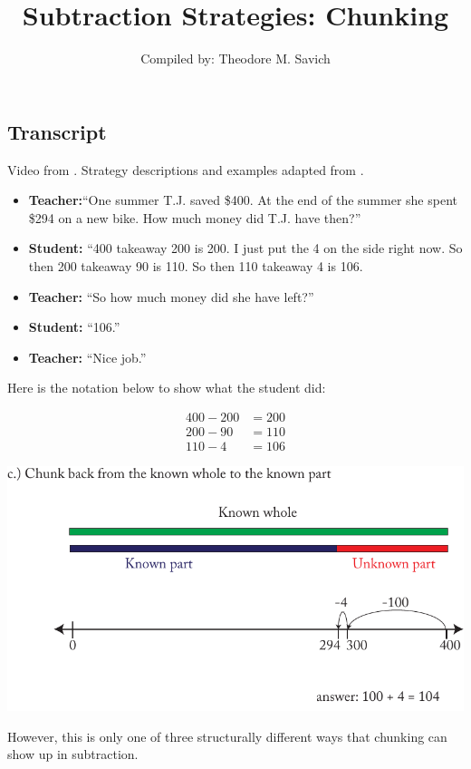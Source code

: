 \documentclass[11pt]{article}
\title{Subtraction Strategies: Chunking}
\author{Compiled by: Theodore M. Savich}
\begin{document}
\maketitle



\subsection*{Transcript}
Video from \textcite{Carpenter1999}. Strategy descriptions and examples adapted from \textcite{HackenbergCourseNotes}. 


\begin{itemize}
    \item \textbf{Teacher:}``One summer T.J. saved \$400. At the end of the summer she spent \$294 on a new bike. How much money did T.J. have then?''
    \item \textbf{Student:} ``400 takeaway 200 is 200. I just put the 4 on the side right now. So then 200 takeaway 90 is 110. So then 110 takeaway 4 is 106. 
    \item \textbf{Teacher:} ``So how much money did she have left?''
    \item \textbf{Student:} ``106.''
    \item \textbf{Teacher:} ``Nice job.''
\end{itemize}

Here is the notation below to show what the student did:

\begin{align*}
400 - 200 &= 200\\
200 - 90 &= 110\\
110 - 4 &= 106
\end{align*}


\includegraphics[width=.8\textwidth]{images/Easy_Pictures/SAR_SUB_CHUNKING_3_Ways/PDF/CHUNKING_BACKWARD_TO_KNOWN_PART.pdf}


However, this is only one of three structurally different ways that chunking can show up in subtraction. 
\end{document}
